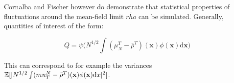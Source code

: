 Cornalba and Fischer \cite{cornalba2025multilevel} however do demonstrate that
statistical properties of fluctuations 
around the mean-field limit $\bar{rho}$ can be simulated. 
Generally, quantities of interest of the form:

\begin{equation}
    Q = \psi\big(N^{1/2} \int (\mu_N^T - \bar{\rho}^T)(\mathbf{x})
    \phi(\mathbf{x})\mathrm{d}\mathbf{x}\big)
\end{equation}


This can correspond to for example the variances 
$\mathbb{E}[|N^{1/2}\int(\\mu_T^N - \bar{\rho}^T)(\mathbf{x})\phi(\mathbf{x})\mathrm{d}x|^2]$.




